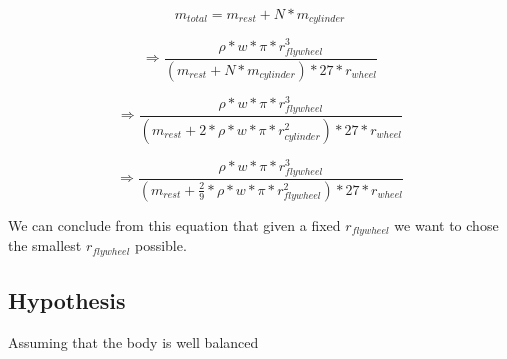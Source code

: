 \[m_{total} = m_{rest} + N * m_{cylinder}\]


\[\Rightarrow \frac{\rho * w * \pi * r_{flywheel}^3}{(m_{rest} + N * m_{cylinder}) * 27 * r_{wheel}}\]

\[\Rightarrow \frac{\rho * w * \pi * r_{flywheel}^3}{(m_{rest} + 2 * \rho * w * \pi * r_{cylinder}^2) * 27 * r_{wheel}}\]

\[\Rightarrow \frac{\rho * w * \pi * r_{flywheel}^3}{(m_{rest} + \frac{2}{9} * \rho * w * \pi * r_{flywheel}^2) * 27 * r_{wheel}}\]

We can conclude from this equation that given a fixed $r_{flywheel}$ we want to chose the smallest $r_{flywheel}$ possible.

\subsection{Hypothesis}
Assuming that the body is well balanced
